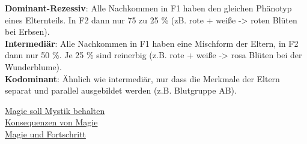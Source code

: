 \textbf{Dominant-Rezessiv}: Alle Nachkommen in F1 haben den gleichen Phänotyp eines Elternteils. In F2 dann nur 75 zu 25 \% (zB. rote + weiße -> roten Blüten bei Erbsen). \\
\textbf{Intermediär}: Alle Nachkommen in F1 haben eine Mischform der Eltern, in F2 dann nur 50 \%. Je 25 \% sind reinerbig (z.B. rote + weiße -> rosa Blüten bei der Wunderblume). \\
\textbf{Kodominant}: Ähnlich wie intermediär, nur dass die Merkmale der Eltern separat und parallel ausgebildet werden (z.B. Blutgruppe AB).


\href{http://www.weltenbau-wissen.de/2015/12/magie-weltenbau-magiesystem-mystik-wissenschaft-teil-1/}{Magie soll Mystik behalten}\\
\href{http://www.weltenbau-wissen.de/2016/01/6-konsequenzen-magie/}{Konsequenzen von Magie}\\
\href{https://meisterperson.wordpress.com/2016/05/05/magie-fortschritt/?pk_campaign=pifeed\&pk_kwd=magie-fortschritt}{Magie und Fortschritt}